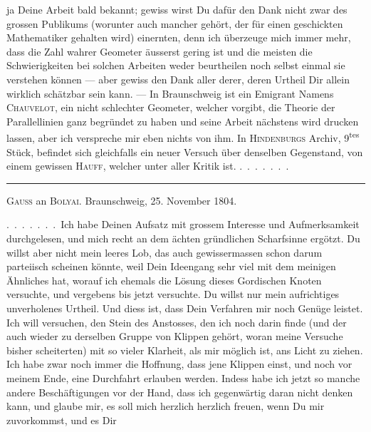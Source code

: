 ja Deine Arbeit bald bekannt; gewiss wirst Du dafür den Dank nicht zwar
des grossen Publikums (worunter auch mancher gehört, der für einen
geschickten Mathematiker gehalten wird) einernten, denn ich überzeuge
mich immer mehr, dass die Zahl wahrer Geometer äusserst gering ist und
die meisten die Schwierigkeiten bei solchen Arbeiten weder beurtheilen
noch selbst einmal sie verstehen können --- aber gewiss den Dank aller
derer, deren Urtheil Dir allein wirklich schätzbar sein kann. --- In
Braunschweig ist ein Emigrant Namens \textsc{Chauvelot}, ein nicht
schlechter Geometer, welcher vorgibt, die Theorie der Parallellinien
ganz begründet zu haben und seine Arbeit nächstens wird drucken
lassen, aber ich verspreche mir eben nichts von ihm. In
\textsc{Hindenburgs} Archiv, 9\textsuperscript{tes} Stück, befindet
sich gleichfalls ein neuer Versuch über denselben Gegenstand, von
einem gewissen \textsc{Hauff}, welcher unter aller Kritik ist. .\, .\, .\, .\, .\, .\, .

\medskip
\begin{center}
\rule{0.3\textwidth}{0.4pt}
\end{center}
\medskip

\begin{center}
\textsc{Gauss} an \textsc{Bolyai}. Braunschweig, 25. November 1804.
\end{center}

.\, .\, .\, .\, .\, .\, .\ Ich habe Deinen Aufsatz mit grossem Interesse und
Aufmerksamkeit durchgelesen, und mich recht an dem ächten gründlichen
Scharfsinne ergötzt. Du willst aber nicht mein leeres Lob, das auch
gewissermassen schon darum parteiisch scheinen könnte, weil Dein
Ideengang sehr viel mit dem meinigen Ähnliches hat, worauf ich
ehemals die Lösung dieses Gordischen Knoten versuchte, und vergebens
bis jetzt versuchte. Du willst nur mein aufrichtiges unverholenes
Urtheil. Und diess ist, dass Dein Verfahren mir noch
Genüge leistet. Ich will versuchen, den Stein des Anstosses, den ich
noch darin finde (und der auch wieder zu derselben Gruppe von Klippen
gehört, woran meine Versuche bisher scheiterten) mit so vieler
Klarheit, als mir möglich ist, ans Licht zu ziehen. Ich habe zwar noch
immer die Hoffnung, dass jene Klippen einst, und noch vor meinem
Ende, eine Durchfahrt erlauben werden. Indess habe ich jetzt so
manche andere Beschäftigungen vor der Hand, dass ich gegenwärtig
daran nicht denken kann, und glaube mir, es soll mich herzlich
herzlich freuen, wenn Du mir zuvorkommst, und es Dir
